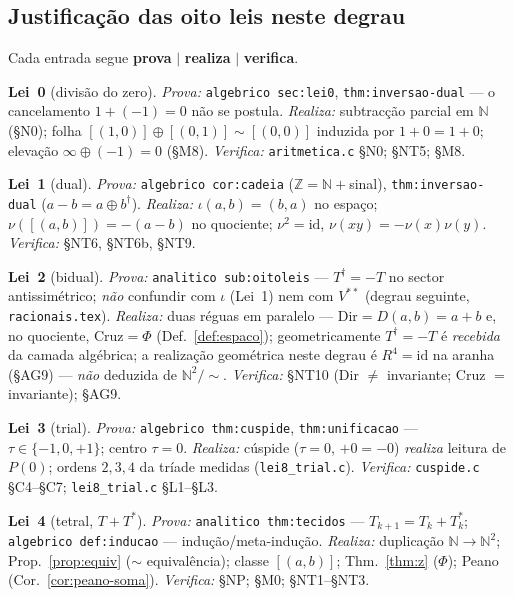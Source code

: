 \documentclass[11pt,a4paper]{article}
\newcommand{\code}[1]{\texttt{\small #1}}
\newcommand{\dg}{^{\dagger}}
\begin{document}
\subsection{Justificação das oito leis neste degrau}\label{sec:leis-realizadas}

\noindent Cada entrada segue \textbf{prova} $\mid$ \textbf{realiza} $\mid$
\textbf{verifica}.

\medskip\noindent\textbf{Lei~0} (divisão do zero).
\emph{Prova:} \code{algebrico sec:lei0}, \code{thm:inversao-dual} --- o
cancelamento $1+(-1)=0$ não se postula.
\emph{Realiza:} subtracção parcial em $\mathbb{N}$ (§N0); folha
$[(1,0)]\oplus[(0,1)]\sim[(0,0)]$ induzida por $1+0=1+0$; elevação
$\infty\oplus(-1)=0$ (§M8).
\emph{Verifica:} \code{aritmetica.c} §N0; §NT5; §M8.

\medskip\noindent\textbf{Lei~1} (dual).
\emph{Prova:} \code{algebrico cor:cadeia} ($\mathbb{Z}=\mathbb{N}+{}$sinal),
\code{thm:inversao-dual} ($a-b=a\oplus b^{\dagger}$).
\emph{Realiza:} $\iota(a,b)=(b,a)$ no espaço; $\nu([(a,b)])=-(a-b)$ no
quociente; $\nu^{2}=\mathrm{id}$, $\nu(xy)=-\nu(x)\nu(y)$.
\emph{Verifica:} §NT6, §NT6b, §NT9.

\medskip\noindent\textbf{Lei~2} (bidual).
\emph{Prova:} \code{analitico sub:oitoleis} --- $T\dg=-T$ no sector
antissimétrico; \emph{não} confundir com $\iota$ (Lei~1) nem com
$V^{**}$ (degrau seguinte, \code{racionais.tex}).
\emph{Realiza:} duas réguas em paralelo --- $\mathrm{Dir}=D(a,b)=a+b$ e, no
quociente, $\mathrm{Cruz}=\Phi$ (Def.~\ref{def:espaco}); geometricamente
$T\dg=-T$ é \emph{recebida} da camada algébrica; a realização geométrica
neste degrau é $R^{4}=\mathrm{id}$ na aranha (§AG9) --- \emph{não} deduzida
de $\mathbb{N}^{2}/{\sim}$.
\emph{Verifica:} §NT10 (Dir $\neq$ invariante; Cruz $=$ invariante); §AG9.

\medskip\noindent\textbf{Lei~3} (trial).
\emph{Prova:} \code{algebrico thm:cuspide}, \code{thm:unificacao} ---
$\tau\in\{-1,0,+1\}$; centro $\tau=0$.
\emph{Realiza:} cúspide ($\tau=0$, $+0=-0$) \emph{realiza} leitura de $P(0)$;
ordens $2,3,4$ da tríade medidas (\code{lei8\_trial.c}).
\emph{Verifica:} \code{cuspide.c} §C4--§C7; \code{lei8\_trial.c} §L1--§L3.

\medskip\noindent\textbf{Lei~4} (tetral, $T+T^{*}$).
\emph{Prova:} \code{analitico thm:tecidos} --- $T_{k+1}=T_k+T_k^{*}$;
\code{algebrico def:inducao} --- indução/meta-indução.
\emph{Realiza:} duplicação $\mathbb{N}\to\mathbb{N}^{2}$; Prop.~\ref{prop:equiv}
($\sim$ equivalência); classe $[(a,b)]$; Thm.~\ref{thm:z} ($\Phi$); Peano
(Cor.~\ref{cor:peano-soma}).
\emph{Verifica:} §NP; §M0; §NT1--§NT3.
\end{document}
